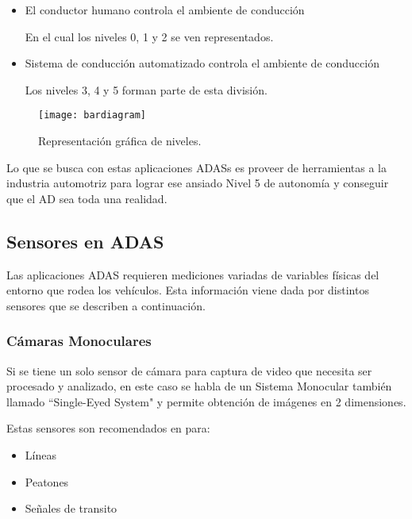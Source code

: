 \begin{itemize}
    \item {El conductor humano controla el ambiente de conducción}
    
    En el cual los niveles 0, 1 y 2 se ven representados.
\end{itemize}
\begin{itemize}
    \item {Sistema de conducción automatizado controla el ambiente de conducción}
    
    Los niveles 3, 4 y 5 forman parte de esta división.
\end{itemize}
\begin{figure}[H]
  \centering
  \texttt{[image: bardiagram]}
  \caption{Representación gráfica de niveles.}
  \label{fig:boat1}
\end{figure}

Lo que se busca con estas aplicaciones ADASs es proveer de herramientas a la industria automotriz para lograr ese ansiado Nivel 5 de autonomía y conseguir que el AD sea toda una realidad.



\subsection{Sensores en ADAS}

Las aplicaciones ADAS requieren mediciones variadas de variables físicas del entorno que rodea los vehículos. Esta información viene dada por distintos sensores que se describen a continuación.

\subsubsection{Cámaras Monoculares}

Si se tiene un solo sensor de cámara para captura de video que necesita ser procesado y analizado, en este caso se habla de un Sistema Monocular también llamado ``Single-Eyed System" y permite obtención de imágenes en 2 dimensiones\cite{Dubey2016}.

Estas sensores son recomendados en \cite{Dubey2016} para: 
\begin{multicols}{3}
\begin{itemize}
    \item {Líneas}
\end{itemize}
\begin{itemize}
    \item {Peatones}
\end{itemize}
\begin{itemize}
    \item {Señales de transito}
\end{itemize}
\end{multicols}

